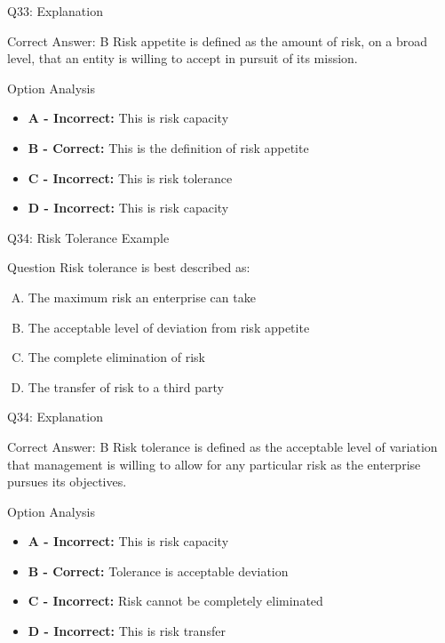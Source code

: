 \documentclass{beamer}
\begin{document}
	\begin{frame}{Q33: Explanation}
		\begin{block}{Correct Answer: B}
			Risk appetite is defined as the amount of risk, on a broad level, that an entity is willing to accept in pursuit of its mission.
		\end{block}
		\begin{block}{Option Analysis}
			\begin{itemize}
				\item \textbf{A - Incorrect:} This is risk capacity
				\item \textbf{B - Correct:} This is the definition of risk appetite
				\item \textbf{C - Incorrect:} This is risk tolerance
				\item \textbf{D - Incorrect:} This is risk capacity
			\end{itemize}
		\end{block}
	\end{frame}
	
	\begin{frame}{Q34: Risk Tolerance Example}
		\begin{block}{Question}
			Risk tolerance is best described as:
		\end{block}
		\begin{enumerate}[(A)]
			\item The maximum risk an enterprise can take
			\item The acceptable level of deviation from risk appetite
			\item The complete elimination of risk
			\item The transfer of risk to a third party
		\end{enumerate}
	\end{frame}
	
	\begin{frame}{Q34: Explanation}
		\begin{block}{Correct Answer: B}
			Risk tolerance is defined as the acceptable level of variation that management is willing to allow for any particular risk as the enterprise pursues its objectives.
		\end{block}
		\begin{block}{Option Analysis}
			\begin{itemize}
				\item \textbf{A - Incorrect:} This is risk capacity
				\item \textbf{B - Correct:} Tolerance is acceptable deviation
				\item \textbf{C - Incorrect:} Risk cannot be completely eliminated
				\item \textbf{D - Incorrect:} This is risk transfer
			\end{itemize}
		\end{block}
	\end{frame}
	
\end{document}
